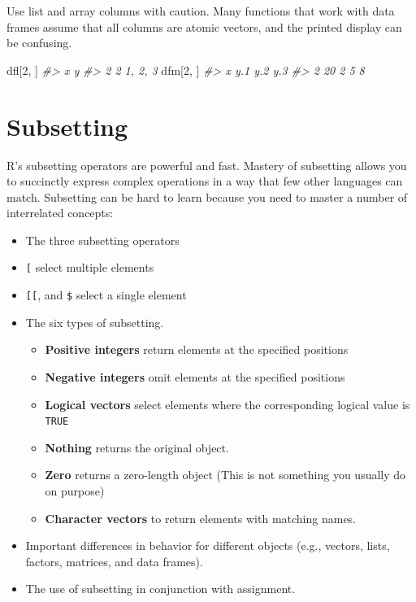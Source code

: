 \documentclass[]{book}
\newenvironment{Shaded}{\begin{snugshade}}{\end{snugshade}}
\newcommand{\DecValTok}[1]{\textcolor[rgb]{0.00,0.00,0.81}{#1}}
\newcommand{\CommentTok}[1]{\textcolor[rgb]{0.56,0.35,0.01}{\textit{#1}}}
\newcommand{\NormalTok}[1]{#1}
\providecommand{\tightlist}{%
  \setlength{\itemsep}{0pt}\setlength{\parskip}{0pt}}
\theoremstyle{definition}
\theoremstyle{definition}
\theoremstyle{definition}
\theoremstyle{remark}
\begin{document}
Use list and array columns with caution. Many functions that work with
data frames assume that all columns are atomic vectors, and the printed
display can be confusing.

\begin{Shaded}
\begin{Highlighting}[]
\NormalTok{dfl[}\DecValTok{2}\NormalTok{, ]}
\CommentTok{#>   x       y}
\CommentTok{#> 2 2 1, 2, 3}
\NormalTok{dfm[}\DecValTok{2}\NormalTok{, ]}
\CommentTok{#>    x y.1 y.2 y.3}
\CommentTok{#> 2 20   2   5   8}
\end{Highlighting}
\end{Shaded}

\chapter{Subsetting}\label{subsetting}

R's subsetting operators are powerful and fast. Mastery of subsetting
allows you to succinctly express complex operations in a way that few
other languages can match. Subsetting can be hard to learn because you
need to master a number of interrelated concepts:

\begin{itemize}
\item
  The three subsetting operators
\item
  \texttt{{[}} select multiple elements
\item
  \texttt{{[}{[}}, and \texttt{\$} select a single element
\item
  The six types of subsetting.

  \begin{itemize}
  \tightlist
  \item
    \textbf{Positive integers} return elements at the specified
    positions
  \item
    \textbf{Negative integers} omit elements at the specified positions
  \item
    \textbf{Logical vectors} select elements where the corresponding
    logical value is \texttt{TRUE}
  \item
    \textbf{Nothing} returns the original object.
  \item
    \textbf{Zero} returns a zero-length object (This is not something
    you usually do on purpose)
  \item
    \textbf{Character vectors} to return elements with matching names.
  \end{itemize}
\item
  Important differences in behavior for different objects (e.g.,
  vectors, lists, factors, matrices, and data frames).
\item
  The use of subsetting in conjunction with assignment.
\end{itemize}
\end{document}
